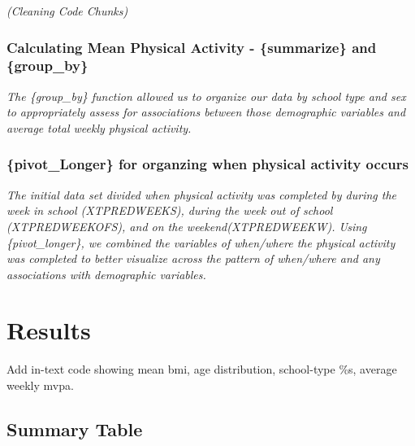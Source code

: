 \documentclass[
]{article}
\begin{document}
\emph{(Cleaning Code Chunks)}

\hypertarget{calculating-mean-physical-activity---summarize-and-group_by}{%
\subsubsection{Calculating Mean Physical Activity - \{summarize\} and
\{group\_by\}}\label{calculating-mean-physical-activity---summarize-and-group_by}}

\emph{The \{group\_by\} function allowed us to organize our data by
school type and sex to appropriately assess for associations between
those demographic variables and average total weekly physical activity.}

\hypertarget{pivot_longer-for-organzing-when-physical-activity-occurs}{%
\subsubsection{\{pivot\_Longer\} for organzing when physical activity
occurs}\label{pivot_longer-for-organzing-when-physical-activity-occurs}}

\emph{The initial data set divided when physical activity was completed
by during the week in school (XTPREDWEEKS), during the week out of
school (XTPREDWEEKOFS), and on the weekend(XTPREDWEEKW). Using
\{pivot\_longer\}, we combined the variables of when/where the physical
activity was completed to better visualize across the pattern of
when/where and any associations with demographic variables.}

\hypertarget{results}{%
\section{Results}\label{results}}

Add in-text code showing mean bmi, age distribution, school-type \%s,
average weekly mvpa.

\hypertarget{summary-table}{%
\subsection{Summary Table}\label{summary-table}}
\end{document}
